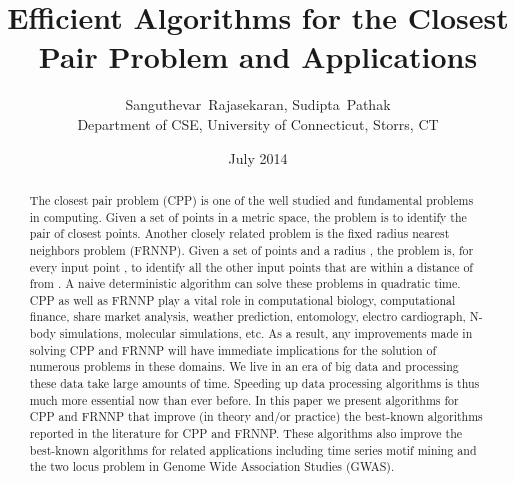 \documentclass{article}
\title{Efficient Algorithms for the Closest Pair Problem and Applications}
\author{Sanguthevar~Rajasekaran,
        Sudipta~Pathak\\
Department of CSE, University of Connecticut, Storrs, CT}
\date{July 2014}
\theoremstyle{definition}
\theoremstyle{remark}
\begin{document}
\maketitle
\begin{abstract}
The closest pair problem (CPP)  is one of the well studied and fundamental problems in computing. Given a set of points in a metric space, the problem is to identify the pair of closest points. Another closely related problem is the fixed radius nearest neighbors problem (FRNNP). Given a set of points and a radius , the problem is, for every input point , to identify all the other input points that are within a distance of  from . A naive deterministic algorithm can solve these problems in quadratic time. CPP as well as FRNNP play a vital role in computational biology, computational finance, share market analysis, weather prediction, entomology, electro cardiograph, N-body simulations, molecular simulations, etc. As a result, any improvements made in solving CPP and FRNNP will have immediate implications for the solution of numerous problems in these domains. We live in an era of big data and processing these data take large amounts of time. Speeding up data processing algorithms is thus much more essential now than ever before. In this paper we present algorithms for CPP and FRNNP that improve (in theory and/or practice) the best-known algorithms reported in the literature for CPP and FRNNP. These algorithms also improve the best-known algorithms for related applications including time series motif mining and the two locus problem in Genome Wide Association Studies (GWAS).
\end{abstract}
\end{document}
